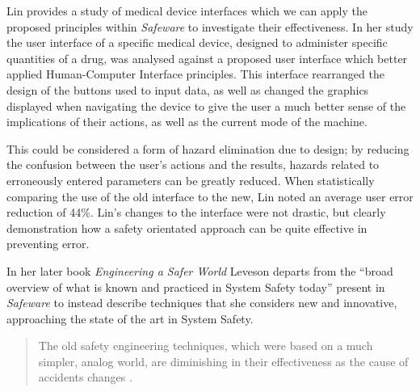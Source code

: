 \documentclass{cshonours}
\begin{document}
Lin \cite{lin2001patient} provides a study of medical device interfaces which we can apply the proposed principles within \textit{Safeware} to investigate their effectiveness. In her study the user interface of a specific medical device, designed to administer specific quantities of a drug, was analysed against a proposed user interface which better applied Human-Computer Interface principles. This interface rearranged the design of the buttons used to input data, as well as changed the graphics displayed when navigating the device to give the user a much better sense of the implications of their actions, as well as the current mode of the machine.

This could be considered a form of hazard elimination due to design; by reducing the confusion between the user's actions and the results, hazards related to erroneously entered parameters can be greatly reduced. When statistically comparing the use of the old interface to the new, Lin noted an average user error reduction of 44\%. Lin's changes to the interface were not drastic, but clearly demonstration how a safety orientated approach can be quite effective in preventing error.

In her later book \textit{Engineering a Safer World} Leveson departs from the ``broad overview of what is known and practiced in System Safety today'' \cite[p.~xviii]{saferworld} present in \textit{Safeware} to instead describe techniques that she considers new and innovative, approaching the state of the art in System Safety.

\begin{quote}
The old safety engineering techniques, which were based on a much simpler, analog world, are diminishing in their effectiveness as the cause of accidents changes \cite[p.~xviii]{saferworld}.
\end{quote}
\end{document}
